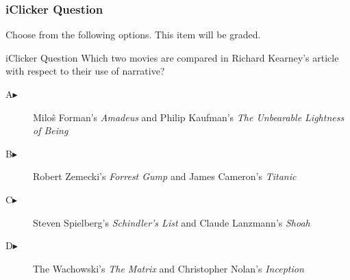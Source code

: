 \begin{frame}
  \frametitle{iClicker Question}
Choose from the following options. This item will be graded.
\begin{block}{iClicker Question}
Which two movies are compared in Richard Kearney's article with
respect to their use of narrative?
\end{block}
\begin{description}
\item[A\hspace{.2in}$\blacktriangleright$] Milo{\^s} Forman's \emph{Amadeus} and Philip Kaufman's \emph{The Unbearable Lightness of Being}
\item[B\hspace{.2in}$\blacktriangleright$] Robert Zemecki's \emph{Forrest Gump} and James Cameron's \emph{Titanic}
\item[C\hspace{.2in}$\blacktriangleright$] Steven Spielberg's \emph{Schindler's List} and Claude Lanzmann's \emph{Shoah}
\item[D\hspace{.2in}$\blacktriangleright$] The Wachowski's \emph{The Matrix} and Christopher Nolan's \emph{Inception}
\end{description}
\end{frame}
